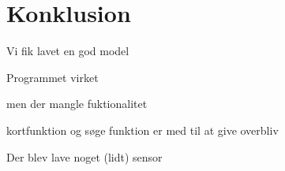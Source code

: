 \chapter{Konklusion}
\label{cha:konklusion}
Vi fik lavet en god model

Programmet virket

men der mangle fuktionalitet

kortfunktion og søge funktion er med til at give overbliv

Der blev lave noget (lidt) sensor